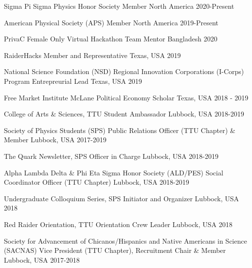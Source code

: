 
\begin{cventries}

    \cventry
    {Sigma Pi Sigma Physics Honor Society}
    {Member}
    {North America}
    {2020-Present}
    {}

    \cventry
    {American Physical Society (APS)}
    {Member}
    {North America}
    {2019-Present}
    {}

    \cventry
    {PrivaC Female Only Virtual Hackathon}
    {Team Mentor}
    {Bangladesh}
    {2020}
    {}


    \cventry
    {RaiderHacks}
    {Member and Representative}
    {Texas, USA}
    {2019}
    {}

    \cventry
    {National Science Foundation (NSD) Regional Innovation Corporations (I-Corps) Program}
    {Entrepreurial Lead}
    {Texas, USA}
    {2019}
    {}

    \cventry
    {Free Market Institute}
    {McLane Political Economy Scholar}
    {Texas, USA}
    {2018 - 2019}
    {}

    \cventry
    {College of Arts \& Sciences, TTU}
    {Student Ambassador}
    {Lubbock, USA}
    {2018-2019}
    {}

    \cventry
    {Society of Physics Students (SPS)}
    {Public Relations Officer (TTU Chapter) \& Member}
    {Lubbock, USA}
    {2017-2019}
    {}

    \cventry
    {The Quark Newsletter, SPS}
    {Officer in Charge}
    {Lubbock, USA}
    {2018-2019}
    {}

    \cventry
    {Alpha Lambda Delta \& Phi Eta Sigma Honor Society (ALD/PES)}
    {Social Coordinator Officer (TTU Chapter)}
    {Lubbock, USA}
    {2018-2019}
    {}

    \cventry
    {Undergraduate Colloquium Series, SPS}
    {Initiator and Organizer}
    {Lubbock, USA}
    {2018}
    {}


    \cventry
    {Red Raider Orientation, TTU}
    {Orientation Crew Leader}
    {Lubbock, USA}
    {2018}
    {}

    \cventry
    {Society for Advancement of Chicanos/Hispanics and Native Americans in Science (SACNAS)}
    {Vice President (TTU Chapter), Recruitment Chair \& Member}
    {Lubbock, USA}
    {2017-2018}
    {}


\end{cventries}

